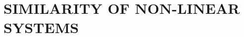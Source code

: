 \chapter{SIMILARITY OF NON-LINEAR SYSTEMS}
\label{chap:similary_of_nonlinear_systems}
\thispagestyle{empty}

